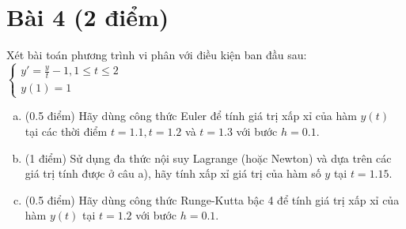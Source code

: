 \documentclass[12pt]{article}
\begin{document}
\section{Bài 4 (2 điểm)}

Xét bài toán phương trình vi phân với điều kiện ban đầu sau:
$
 \left\lbrace \begin{array}{l}
               y' = \frac{y}{t}-1, 1 \leq t \leq 2 \\
               y(1)=1
              \end{array}
\right.
$

\begin{enumerate}[a).]
\item (0.5 điểm) Hãy dùng công thức Euler để tính giá trị xấp xỉ của hàm $y(t)$ tại các thời điểm $t=1.1, t=1.2$ và $t=1.3$ với bước $h=0.1$.
\item (1 điểm) Sử dụng đa thức nội suy Lagrange (hoặc Newton) và dựa trên các giá trị tính được ở câu a), hãy tính xấp xỉ giá trị của hàm số $y$ tại $t=1.15$.
\item (0.5 điểm) Hãy dùng công thức Runge-Kutta bậc 4 để tính giá trị xấp xỉ của hàm $y(t)$ tại $t=1.2$ với bước $h=0.1$.
\end{enumerate}
\end{document}
